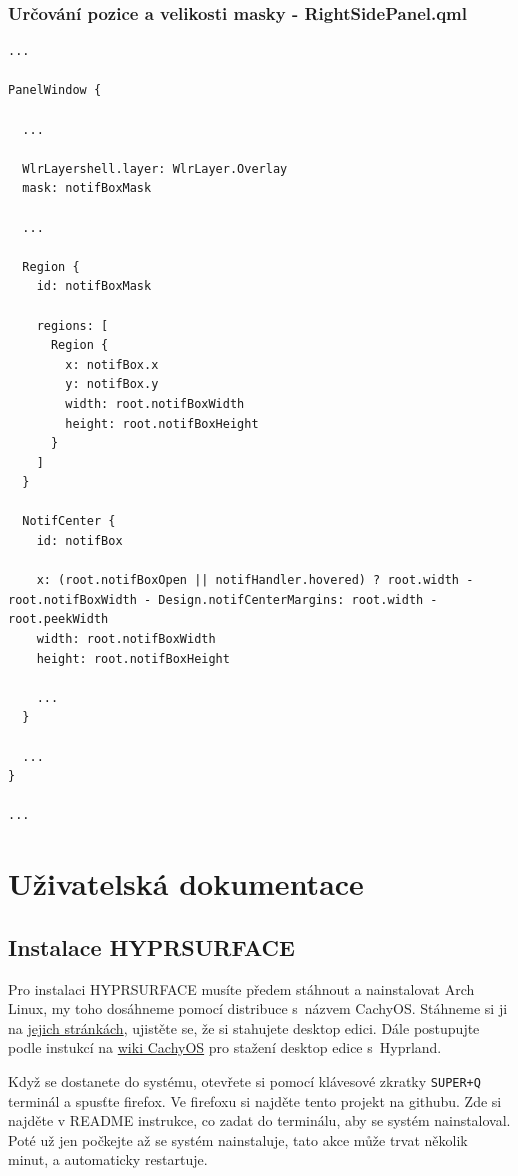 \documentclass[12pt,a4paper]{article}
\begin{document}
\subsubsection{Určování pozice a velikosti masky - RightSidePanel.qml}
\label{RightSidePanel.qml 0}
\begin{lstlisting}
...

PanelWindow {

  ...

  WlrLayershell.layer: WlrLayer.Overlay
  mask: notifBoxMask

  ...

  Region {
    id: notifBoxMask

    regions: [
      Region {
        x: notifBox.x
        y: notifBox.y
        width: root.notifBoxWidth
        height: root.notifBoxHeight
      }
    ]
  }

  NotifCenter {
    id: notifBox

    x: (root.notifBoxOpen || notifHandler.hovered) ? root.width - root.notifBoxWidth - Design.notifCenterMargins: root.width - root.peekWidth
    width: root.notifBoxWidth
    height: root.notifBoxHeight

    ...
  }

  ...
}

...
\end{lstlisting}



\newpage
\section{Uživatelská dokumentace}
\subsection{Instalace HYPRSURFACE}
Pro instalaci HYPRSURFACE musíte předem stáhnout a nainstalovat Arch Linux, my toho dosáhneme pomocí distribuce s~názvem
CachyOS. \autocite{CachyOSBlazinglyFast} Stáhneme si ji na \href{https://cachyos.org/download/}{jejich stránkách}, 
ujistěte se, že si stahujete desktop edici. Dále postupujte podle instukcí na \href{https://wiki.cachyos.org/installation/installation_on_root/}
{wiki CachyOS} pro stažení desktop edice s~Hyprland.

Když se dostanete do systému, otevřete si pomocí klávesové zkratky \verb|SUPER+Q| terminál a spusťte firefox. Ve firefoxu si najděte
tento projekt na githubu. Zde si najděte v README instrukce, co zadat do terminálu, aby se systém nainstaloval. Poté už jen
počkejte až se systém nainstaluje, tato akce může trvat několik minut, a automaticky restartuje.
\end{document}

